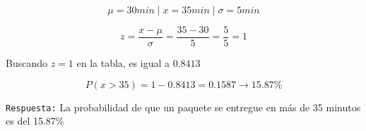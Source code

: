\documentclass[12pt]{article}
\begin{document}
\begin{enumerate}[label=\textbf{\arabic*.}]
        \[\mu = 30min \mid x = 35min \mid \sigma = 5min\]

        \[z = \frac{x - \mu}{\sigma} = \frac{35 - 30}{5} = \frac{5}{5} = 1\]

        Buscando $z = 1$ en la tabla, es igual a $0.8413$

        \[P(x > 35)= 1 - 0.8413 = 0.1587 \longrightarrow 15.87\%\]

        \texttt{Respuesta:} La probabilidad de que un paquete se entregue en más de 35 minutos es del 15.87\%
        
    \end{enumerate}
\end{document}
